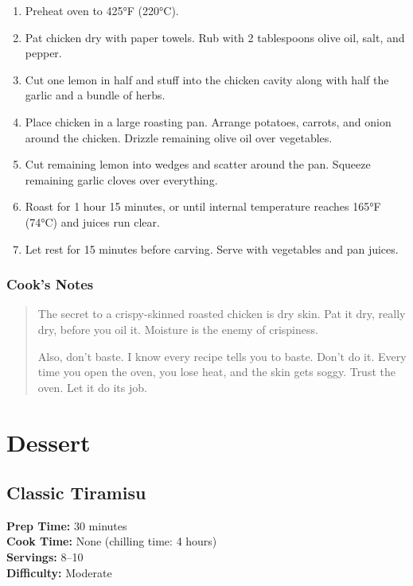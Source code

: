 \documentclass[
    language=english,
    doctype=recipe-book,
    institution=none,
]{../../omnilatex}
\begin{document}
\begin{enumerate}
    \item Preheat oven to 425°F (220°C).
    \item Pat chicken dry with paper towels. Rub with 2 tablespoons olive oil, salt, and pepper.
    \item Cut one lemon in half and stuff into the chicken cavity along with half the garlic and a bundle of herbs.
    \item Place chicken in a large roasting pan. Arrange potatoes, carrots, and onion around the chicken. Drizzle remaining olive oil over vegetables.
    \item Cut remaining lemon into wedges and scatter around the pan. Squeeze remaining garlic cloves over everything.
    \item Roast for 1 hour 15 minutes, or until internal temperature reaches 165°F (74°C) and juices run clear.
    \item Let rest for 15 minutes before carving. Serve with vegetables and pan juices.
\end{enumerate}

\subsection*{Cook's Notes}
\begin{quote}
The secret to a crispy-skinned roasted chicken is dry skin. Pat it dry, really dry, before you oil it. Moisture is the enemy of crispiness.

Also, don't baste. I know every recipe tells you to baste. Don't do it. Every time you open the oven, you lose heat, and the skin gets soggy. Trust the oven. Let it do its job.
\end{quote}

\chapter{Dessert}

\section*{Classic Tiramisu}

\begin{recipebox}
\textbf{Prep Time:} 30 minutes\\
\textbf{Cook Time:} None (chilling time: 4 hours)\\
\textbf{Servings:} 8--10\\
\textbf{Difficulty:} Moderate
\end{recipebox}
\end{document}
